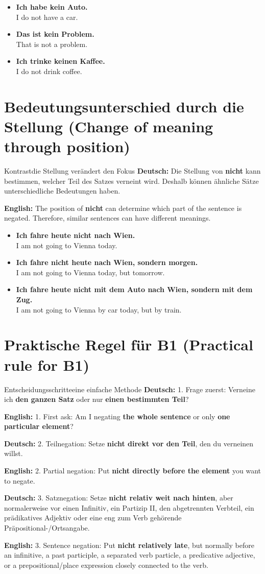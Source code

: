 \documentclass[a4paper,11pt]{article}
\newcommand{\GermanText}[1]{\textbf{Deutsch: }#1\par}
\newcommand{\EnglishText}[1]{{\small\color{SoftGray}\textbf{English: }#1\par}}
\newcommand{\ExampleItem}[2]{\item \textbf{#1}\\{\small\color{SoftGray}#2}}
\begin{document}
\begin{exbox}
\begin{itemize}
\ExampleItem{Ich habe \textbf{kein Auto}.}{I do not have a car.}
\ExampleItem{Das ist \textbf{kein Problem}.}{That is not a problem.}
\ExampleItem{Ich trinke \textbf{keinen Kaffee}.}{I do not drink coffee.}
\end{itemize}
\end{exbox}

\section{Bedeutungsunterschied durch die Stellung \textnormal{(Change of meaning through position)}}

\begin{grammarentry}{Kontrast}{die Stellung verändert den Fokus}
\GermanText{Die Stellung von \textbf{nicht} kann bestimmen, welcher Teil des Satzes verneint wird. Deshalb können ähnliche Sätze unterschiedliche Bedeutungen haben.}
\EnglishText{The position of \textbf{nicht} can determine which part of the sentence is negated. Therefore, similar sentences can have different meanings.}
\end{grammarentry}

\begin{exbox}
\begin{itemize}
\ExampleItem{Ich fahre heute \textbf{nicht nach Wien}.}{I am not going to Vienna today.}
\ExampleItem{Ich fahre \textbf{nicht heute} nach Wien, sondern morgen.}{I am not going to Vienna today, but tomorrow.}
\ExampleItem{Ich fahre heute \textbf{nicht mit dem Auto} nach Wien, sondern mit dem Zug.}{I am not going to Vienna by car today, but by train.}
\end{itemize}
\end{exbox}

\section{Praktische Regel für B1 \textnormal{(Practical rule for B1)}}

\begin{grammarentry}{Entscheidungsschritte}{eine einfache Methode}
\GermanText{1. Frage zuerst: Verneine ich \textbf{den ganzen Satz} oder nur \textbf{einen bestimmten Teil}?}
\EnglishText{1. First ask: Am I negating \textbf{the whole sentence} or only \textbf{one particular element}?}

\GermanText{2. Teilnegation: Setze \textbf{nicht direkt vor den Teil}, den du verneinen willst.}
\EnglishText{2. Partial negation: Put \textbf{nicht directly before the element} you want to negate.}

\GermanText{3. Satznegation: Setze \textbf{nicht relativ weit nach hinten}, aber normalerweise vor einen Infinitiv, ein Partizip II, den abgetrennten Verbteil, ein prädikatives Adjektiv oder eine eng zum Verb gehörende Präpositional-/Ortsangabe.}
\EnglishText{3. Sentence negation: Put \textbf{nicht relatively late}, but normally before an infinitive, a past participle, a separated verb particle, a predicative adjective, or a prepositional/place expression closely connected to the verb.}
\end{grammarentry}
\end{document}
